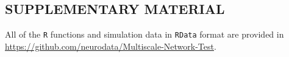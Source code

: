 \documentclass[11pt]{article}
\theoremstyle{definition}
\begin{document}
\subsection*{SUPPLEMENTARY MATERIAL}

All of the \texttt{R} functions and simulation data in \texttt{RData} format are provided in \url{https://github.com/neurodata/Multiscale-Network-Test}.

	
\end{document}
